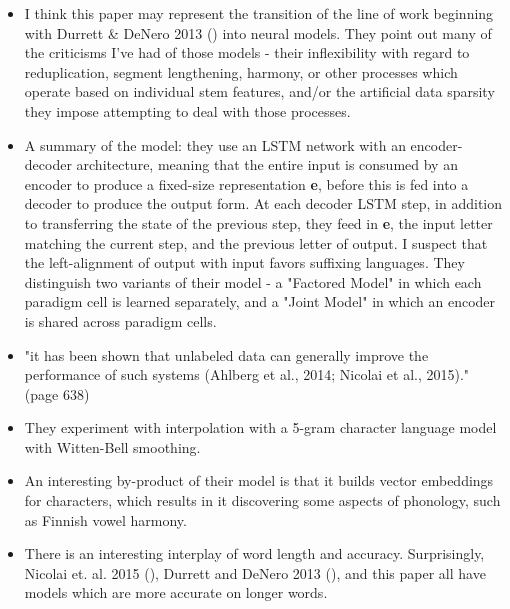 \documentclass[12pt]{report}
\begin{document}
\begin{itemize}
	
	\item I think this paper may represent the transition of the line of work beginning with Durrett \& DeNero 2013 (\cite{Durrett2013}) into neural models. They point out many of the criticisms I've had of those models - their inflexibility with regard to reduplication, segment lengthening, harmony, or other processes which operate based on individual stem features, and/or the artificial data sparsity they impose attempting to deal with those processes.
	
	\item A summary of the model: they use an LSTM network with an encoder-decoder architecture, meaning that the entire input is consumed by an encoder to produce a fixed-size representation \textbf{e}, before this is fed into a decoder to produce the output form. At each decoder LSTM step, in addition to transferring the state of the previous step, they feed in \textbf{e}, the input letter matching the current step, and the previous letter of output. I suspect that the left-alignment of output with input favors suffixing languages. They distinguish two variants of their model - a "Factored Model" in which each paradigm cell is learned separately, and a "Joint Model" in which an encoder is shared across paradigm cells.
	
	\item "it has been shown that unlabeled data can generally improve the performance of such systems (Ahlberg et al., 2014; Nicolai et al., 2015)." (page 638)
	
	\item They experiment with interpolation with a 5-gram character language model with Witten-Bell smoothing.
	
	\item An interesting by-product of their model is that it builds vector embeddings for characters, which results in it discovering some aspects of phonology, such as Finnish vowel harmony.
	
	\item There is an interesting interplay of word length and accuracy. Surprisingly, Nicolai et. al. 2015 (\cite{Nicolai2015}), Durrett and DeNero 2013 (\cite{Durrett2013}), and this paper all have models which are more accurate on longer words.
	
\end{itemize}

\end{document}
